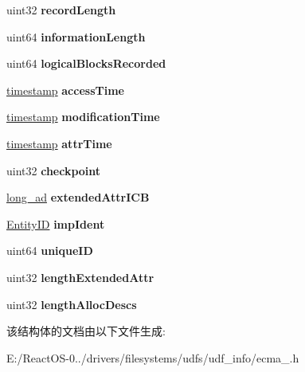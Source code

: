 \begin{DoxyCompactItemize}
uint32 {\bfseries record\+Length}
\item 
\mbox{\label{struct___f_i_l_e___e_n_t_r_y_ad1c330f941cd4afc227f4e4dec366c0d}} 
uint64 {\bfseries information\+Length}
\item 
\mbox{\label{struct___f_i_l_e___e_n_t_r_y_abac5a9144087e873058b84beb4c02d6d}} 
uint64 {\bfseries logical\+Blocks\+Recorded}
\item 
\mbox{\label{struct___f_i_l_e___e_n_t_r_y_ac3f54222bd6c80b427a60762e9875959}} 
\hyperlink{structtimestamp}{timestamp} {\bfseries access\+Time}
\item 
\mbox{\label{struct___f_i_l_e___e_n_t_r_y_aabfc409e004abc433b39ad99d2ceacf7}} 
\hyperlink{structtimestamp}{timestamp} {\bfseries modification\+Time}
\item 
\mbox{\label{struct___f_i_l_e___e_n_t_r_y_af0c3e5378dfa24698770ae495851b9cf}} 
\hyperlink{structtimestamp}{timestamp} {\bfseries attr\+Time}
\item 
\mbox{\label{struct___f_i_l_e___e_n_t_r_y_a72271b4507b9855240a1aada0ad4c73e}} 
uint32 {\bfseries checkpoint}
\item 
\mbox{\label{struct___f_i_l_e___e_n_t_r_y_adb8c6772266bab7ee391855463cd7696}} 
\hyperlink{structlong__ad}{long\+\_\+ad} {\bfseries extended\+Attr\+I\+CB}
\item 
\mbox{\label{struct___f_i_l_e___e_n_t_r_y_aa2027e21d0f0a74affd7662c80fa200c}} 
\hyperlink{struct_entity_i_d}{Entity\+ID} {\bfseries imp\+Ident}
\item 
\mbox{\label{struct___f_i_l_e___e_n_t_r_y_ac282499493c5fd7a6125accf8db320c3}} 
uint64 {\bfseries unique\+ID}
\item 
\mbox{\label{struct___f_i_l_e___e_n_t_r_y_a8b113ccf39343c30a93063668e6c3fc2}} 
uint32 {\bfseries length\+Extended\+Attr}
\item 
\mbox{\label{struct___f_i_l_e___e_n_t_r_y_a5a6d1baad27cdc0c0a8ce0fdead7ab20}} 
uint32 {\bfseries length\+Alloc\+Descs}
\end{DoxyCompactItemize}


该结构体的文档由以下文件生成\+:\begin{DoxyCompactItemize}
\item 
E\+:/\+React\+O\+S-\/0../drivers/filesystems/udfs/udf\+\_\+info/ecma\+\_.\+h\end{DoxyCompactItemize}

